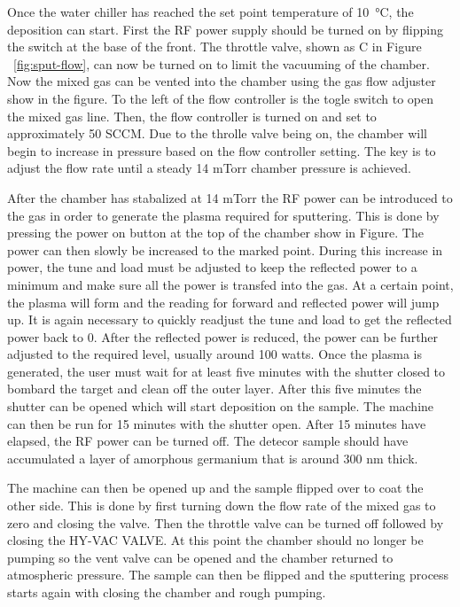 Once the water chiller has reached the set point temperature of \SI{10}{\celsius}, the deposition can start.
First the RF power supply should be turned on by flipping the switch at the base of the front.
The throttle valve, shown as C in Figure ~\ref{fig:sput-flow}, can now be turned on to limit the vacuuming of the chamber.
Now the mixed gas can be vented into the chamber using the gas flow adjuster show in the figure.
To the left of the flow controller is the togle switch to open the mixed gas line.
Then, the flow controller is turned on and set to approximately 50 SCCM.
Due to the throlle valve being on, the chamber will begin to increase in pressure based on the flow controller setting.
The key is to adjust the flow rate until a steady 14 mTorr chamber pressure is achieved.

After the chamber has stabalized at 14 mTorr the RF power can be introduced to the gas in order to generate the plasma required for sputtering.
This is done by pressing the power on button at the top of the chamber show in Figure.
The power can then slowly be increased to the marked point.
During this increase in power, the tune and load must be adjusted to keep the reflected power to a minimum and make sure all the power is transfed into the gas.
At a certain point, the plasma will form and the reading for forward and reflected power will jump up.
It is again necessary to quickly readjust the tune and load to get the reflected power back to 0.
After the reflected power is reduced, the power can be further adjusted to the required level, usually around 100 watts.
Once the plasma is generated, the user must wait for at least five minutes with the shutter closed to bombard the target and clean off the outer layer.
After this five minutes the shutter can be opened which will start deposition on the sample.
The machine can then be run for 15 minutes with the shutter open.
After 15 minutes have elapsed, the RF power can be turned off.
The detecor sample should have accumulated a layer of amorphous germanium that is around 300 nm thick.

The machine can then be opened up and the sample flipped over to coat the other side.
This is done by first turning down the flow rate of the mixed gas to zero and closing the valve.
Then the throttle valve can be turned off followed by closing the HY-VAC VALVE.
At this point the chamber should no longer be pumping so the vent valve can be opened and the chamber returned to atmospheric pressure.
The sample can then be flipped and the sputtering process starts again with closing the chamber and rough pumping.

